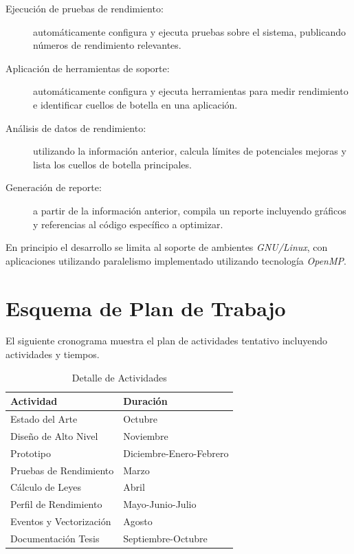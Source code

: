\documentclass[a4paper]{article}
\begin{document}
  \begin{description}
  \item[Ejecución de pruebas de rendimiento:] automáticamente configura y ejecuta pruebas sobre el sistema, publicando números de rendimiento relevantes.
  \item[Aplicación de herramientas de soporte:] automáticamente configura y ejecuta herramientas para medir rendimiento e identificar cuellos de botella en una aplicación.
  \item[Análisis de datos de rendimiento:] utilizando la información anterior, calcula límites de potenciales mejoras y lista los cuellos de botella principales.
  \item[Generación de reporte:] a partir de la información anterior, compila un reporte incluyendo gráficos y referencias al código específico a optimizar.
  \end{description}

En principio el desarrollo se limita al soporte de ambientes {\it GNU/Linux}, con aplicaciones utilizando paralelismo implementado utilizando tecnología {\it OpenMP}.

\section{Esquema de Plan de Trabajo}

El siguiente cronograma muestra el plan de actividades tentativo incluyendo actividades y tiempos.

\begin{table}[H]
  \caption{Detalle de Actividades}
  \centering
    \begin{tabular}{|l|l|}\hline
      {\bf Actividad} & {\bf Duración} \\ \hline
	Estado del Arte & Octubre \\ \hline
      Diseño de Alto Nivel & Noviembre \\ \hline
      Prototipo & Diciembre-Enero-Febrero \\ \hline
      Pruebas de Rendimiento & Marzo \\ \hline
      Cálculo de Leyes & Abril \\ \hline
      Perfil de Rendimiento & Mayo-Junio-Julio \\ \hline
      Eventos y Vectorización & Agosto \\ \hline
      Documentación Tesis & Septiembre-Octubre \\ \hline
    \end{tabular}
  \label{schedule}
\end{table}
\end{document}
